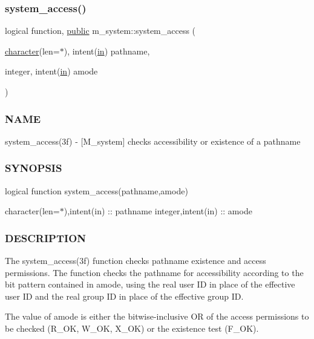 \subsubsection{\texorpdfstring{system\+\_\+access()}{system\_access()}}
{\footnotesize\ttfamily logical function, \hyperlink{M__stopwatch_83_8txt_a2f74811300c361e53b430611a7d1769f}{public} m\+\_\+system\+::system\+\_\+access (\begin{DoxyParamCaption}\item[{\hyperlink{option__stopwatch_83_8txt_abd4b21fbbd175834027b5224bfe97e66}{character}(len=$\ast$), intent(\hyperlink{M__journal_83_8txt_afce72651d1eed785a2132bee863b2f38}{in})}]{pathname,  }\item[{integer, intent(\hyperlink{M__journal_83_8txt_afce72651d1eed785a2132bee863b2f38}{in})}]{amode }\end{DoxyParamCaption})}



\subsubsection*{N\+A\+ME}

system\+\_\+access(3f) -\/ \mbox{[}M\+\_\+system\mbox{]} checks accessibility or existence of a pathname 

\subsubsection*{S\+Y\+N\+O\+P\+S\+IS}

logical function system\+\_\+access(pathname,amode)

character(len=$\ast$),intent(in) \+:\+: pathname integer,intent(in) \+:\+: amode

\subsubsection*{D\+E\+S\+C\+R\+I\+P\+T\+I\+ON}

\begin{DoxyVerb}The system_access(3f) function checks pathname existence and access
permissions.  The function checks the pathname for accessibility
according to the bit pattern contained in amode, using the real user
ID in place of the effective user ID and the real group ID in place
of the effective group ID.

The value of amode is either the bitwise-inclusive OR of the access
permissions to be checked (R_OK, W_OK, X_OK) or the existence test (F_OK).
\end{DoxyVerb}



